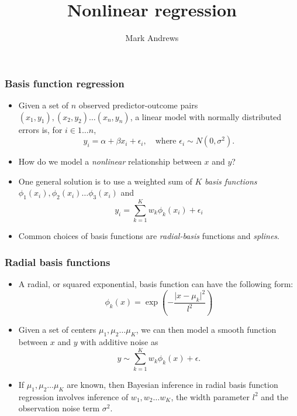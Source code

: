\documentclass{slides}
\title[MCMC]{Nonlinear regression}
\author[Andrews]{Mark Andrews}
\begin{document}
{
	\begin{frame}
		\titlepage
	\end{frame}
}


\begin{frame}
	\frametitle{Basis function regression}
	\begin{itemize}
	\item Given a set of $n$ observed predictor-outcome pairs $(x_1, y_1), (x_2, y_2) \ldots (x_n, y_n)$, a linear model with normally distributed errors is, for $i \in 1 \ldots n$,
		\[
			y_i = \alpha + \beta x_i + \epsilon_i, \quad \text{where $\epsilon_i \sim N(0, \sigma^2)$}.
		\]
	\item How do we model a \emph{nonlinear} relationship between $x$ and $y$?
	\item One general solution is to use a weighted sum of $K$ \emph{basis functions} $\phi_1(x_i), \phi_2(x_i) \ldots \phi_3(x_i)$
		and 
		\[
			y_i = \sum_{k=1}^K w_k \phi_k(x_i) + \epsilon_i
		\]
	\item Common choices of basis functions are \emph{radial-basis} functions and \emph{splines}.
	\end{itemize}
\end{frame}

\begin{frame}
	\frametitle{Radial basis functions}
	\begin{itemize}
		\item A radial, or squared exponential, basis function can have the following form:
			\[
				\phi_k(x) = \exp\left( - \frac{\vert x - \mu_k \vert^2}{l^2} \right)
			\]
		\item Given a set of centers $\mu_1, \mu_2 \ldots \mu_K$, we can then model a smooth function between $x$ and $y$ with additive noise as 
			\[
				y \sim \sum_{k=1}^K w_k \phi_k(x) + \epsilon.
			\]
		\item If $\mu_1, \mu_2 \ldots \mu_K$ are known, then Bayesian inference in radial basis function regression involves inference of $w_1, w_2 \ldots w_K$, the width parameter $l^2$ and the observation noise term $\sigma^2$.
	\end{itemize}
\end{frame}
\end{document}
